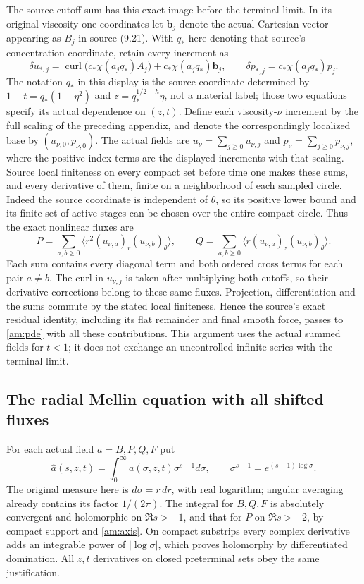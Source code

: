 The source cutoff sum has this exact image before the terminal limit.
In its original viscosity-one coordinates let
$\mathbf b_j$ denote the actual Cartesian vector appearing as $B_j$
in source (9.21). With $q_*$ here denoting that source's concentration
coordinate, retain every increment as
\[
 \delta u_{*,j}=\operatorname{curl}
          \bigl(c_*\chi(a_jq_*)A_j\bigr)
                  +c_*\chi(a_jq_*)\mathbf b_j,
 \qquad
 \delta p_{*,j}=c_*\chi(a_jq_*)p_j.
\]
The notation $q_*$ in this display is the source coordinate determined
by $1-t=q_*(1-\eta^2)$ and $z=q_*^{1/2-h}\eta$, not a material
label; those two equations specify its actual dependence on $(z,t)$.
Define each viscosity-$\nu$ increment by the full scaling of the
preceding appendix, and denote the correspondingly localized base by
$(u_{\nu,0},p_{\nu,0})$. The actual fields are
$u_\nu=\sum_{j\geq0}u_{\nu,j}$ and
$p_\nu=\sum_{j\geq0}p_{\nu,j}$, where the positive-index terms are
the displayed increments with that scaling. Source local finiteness
on every compact set before time one makes these sums, and every
derivative of them, finite on a neighborhood of each sampled circle.
Indeed the source coordinate is independent of $\theta$, so its
positive lower bound and its finite set of active stages can be
chosen over the entire compact circle. Thus the exact nonlinear fluxes
are
\[
 P=\sum_{a,b\geq0}\langle r^2(u_{\nu,a})_r(u_{\nu,b})_\theta\rangle,
 \qquad
 Q=\sum_{a,b\geq0}\langle r(u_{\nu,a})_z(u_{\nu,b})_\theta\rangle.
\]
Each sum contains every diagonal term and both ordered cross terms
for each pair $a\ne b$. The curl in $u_{\nu,j}$ is taken after
multiplying both cutoffs, so their derivative corrections belong to
these same fluxes. Projection, differentiation and the sums commute
by the stated local finiteness. Hence the source's exact residual
identity, including its flat remainder and final smooth force,
passes to \eqref{am:pde} with all these contributions. This argument
uses the actual summed fields for $t<1$; it does not exchange an
uncontrolled infinite series with the terminal limit.

\subsection*{The radial Mellin equation with all shifted fluxes}

For each actual field $a=B,P,Q,F$ put
\[
 \widehat a(s,z,t)=\int_0^\infty a(\sigma,z,t)\sigma^{s-1}d\sigma,
 \qquad \sigma^{s-1}=e^{(s-1)\log\sigma}.
\]
The original measure here is $d\sigma=r\,dr$, with real logarithm;
angular averaging already contains its factor $1/(2\pi)$.
The integral for $B,Q,F$ is absolutely convergent and holomorphic on
$\Re s>-1$, and that for $P$ on $\Re s>-2$, by compact support
and \eqref{am:axis}. On compact substrips every complex derivative
adds an integrable power of $|\log\sigma|$, which proves
holomorphy by differentiated domination. All $z,t$ derivatives on
closed preterminal sets obey the same justification.

